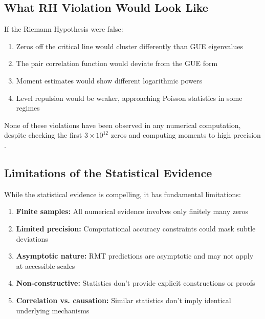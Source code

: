\subsection{What RH Violation Would Look Like}

\begin{theorem}
\label{thm:rh_violation_signatures}
If the Riemann Hypothesis were false:
\begin{enumerate}[label=(\alph*)]
\item Zeros off the critical line would cluster differently than GUE eigenvalues
\item The pair correlation function would deviate from the GUE form
\item Moment estimates would show different logarithmic powers
\item Level repulsion would be weaker, approaching Poisson statistics in some regimes
\end{enumerate}
\end{theorem}

\begin{remark}
None of these violations have been observed in any numerical computation, despite checking the first $3 \times 10^{12}$ zeros and computing moments to high precision \cite{plattrigaux2020}.
\end{remark}

\subsection{Limitations of the Statistical Evidence}

\begin{important}
While the statistical evidence is compelling, it has fundamental limitations:
\begin{enumerate}
\item \textbf{Finite samples:} All numerical evidence involves only finitely many zeros
\item \textbf{Limited precision:} Computational accuracy constraints could mask subtle deviations
\item \textbf{Asymptotic nature:} RMT predictions are asymptotic and may not apply at accessible scales
\item \textbf{Non-constructive:} Statistics don't provide explicit constructions or proofs
\item \textbf{Correlation vs. causation:} Similar statistics don't imply identical underlying mechanisms
\end{enumerate}
\end{important}

